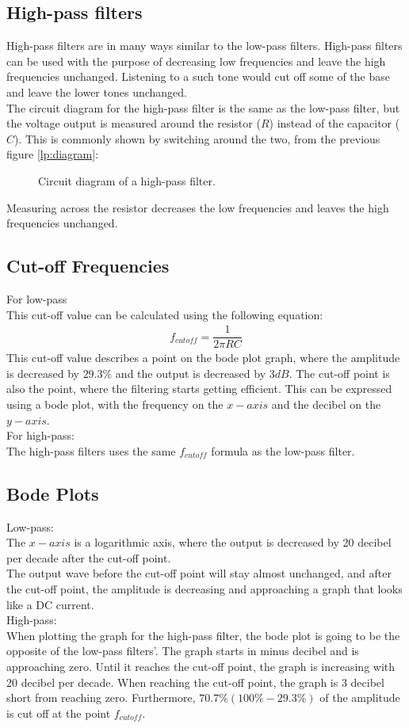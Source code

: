 \subsection{High-pass filters}
High-pass filters are in many ways similar to the low-pass filters. High-pass filters can be used with the purpose of decreasing low frequencies and leave the high frequencies unchanged. Listening to a such tone would cut off some of the base and leave the lower tones unchanged. \\
The circuit diagram for the high-pass filter is the same as the low-pass filter, but the voltage output is measured around the resistor ($R$) instead of the capacitor ($C$). This is commonly shown by switching around the two, from the previous figure \ref{lp:diagram}:
\begin{figure}[H]
	
	\caption{Circuit diagram of a high-pass filter.}
	\label{hp:diagram}
\end{figure} 
Measuring across the resistor decreases the low frequencies and leaves the high frequencies unchanged. 
\subsection{Cut-off Frequencies}
For low-pass \\
This cut-off value can be calculated using the following equation:
\begin{align*}
f_{cutoff}=\dfrac{1}{2 \pi RC}
\end{align*}
This cut-off value describes a point on the bode plot graph, where the amplitude is decreased by $29.3\%$ and the output is decreased by $3dB$. The cut-off point is also the point, where the filtering starts getting efficient. This can be expressed using a bode plot, with the frequency on the $x-axis$ and the decibel on the $y-axis$.\\
For high-pass: \\
The high-pass filters uses the same $f_{cutoff}$ formula as the low-pass filter.

\subsection{Bode Plots}
Low-pass: \\
The $x-axis$ is a logarithmic axis, where the output is decreased by 20 decibel per decade after the cut-off point. \\
The output wave before the cut-off point will stay almost unchanged, and after the cut-off point, the amplitude is decreasing and approaching a graph that looks like a DC current. \\
High-pass: \\
When plotting the graph for the high-pass filter, the bode plot is going to be the opposite of the low-pass filters'. The graph starts in minus decibel and is approaching zero. Until it reaches the cut-off point, the graph is increasing with 20 decibel per decade. When reaching the cut-off point, the graph is 3 decibel short from reaching zero. Furthermore, $70.7\% (100\%-29.3\%)$ of the amplitude is cut off at the point $f_{cutoff}$.

